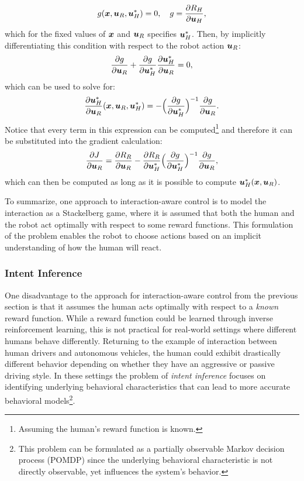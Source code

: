\begin{equation*}
g(\bm{x}, \bm{u}_R, \bm{u}_H^*) = 0, \quad g = \frac{\partial R_H}{\partial \bm{u}_H},
\end{equation*}
which for the fixed values of $\bm{x}$ and $\bm{u}_R$ specifies $\bm{u}_H^*$.
Then, by implicitly differentiating this condition with respect to the robot action $\bm{u}_R$:
\begin{equation*}
\frac{\partial g}{\partial \bm{u}_R} + \frac{\partial g}{\partial \bm{u}_H^*}\frac{\partial \bm{u}_H^*}{\partial \bm{u}_R} = 0,
\end{equation*}
which can be used to solve for:
\begin{equation*}
\frac{\partial \bm{u}_H^*}{\partial \bm{u}_R}(\bm{x}, \bm{u}_R, \bm{u}_H^*) = -\Big(\frac{\partial g}{\partial \bm{u}_H^*}\Big)^{-1}\frac{\partial g}{\partial \bm{u}_R}.
\end{equation*}
Notice that every term in this expression can be computed\footnote{Assuming the human's reward function is known.} and therefore it can be substituted into the gradient calculation:
\begin{equation*}
\frac{\partial J}{\partial \bm{u}_R} = \frac{\partial R_R}{\partial \bm{u}_R} - \frac{\partial R_R}{\partial \bm{u}_H^*}\Big(\frac{\partial g}{\partial \bm{u}_H^*}\Big)^{-1}\frac{\partial g}{\partial \bm{u}_R},
\end{equation*}
which can then be computed as long as it is possible to compute $\bm{u}_H^*(\bm{x}, \bm{u}_R)$.

To summarize, one approach to interaction-aware control is to model the interaction as a Stackelberg game, where it is assumed that both the human and the robot act optimally with respect to some reward functions. This formulation of the problem enables the robot to choose actions based on an implicit understanding of how the human will react.

\subsubsection{Intent Inference}
One disadvantage to the approach for interaction-aware control from the previous section is that it assumes the human acts optimally with respect to a \textit{known} reward function. While a reward function could be learned through inverse reinforcement learning, this is not practical for real-world settings where different humans behave differently. Returning to the example of interaction between human drivers and autonomous vehicles, the human could exhibit drastically different behavior depending on whether they have an aggressive or passive driving style. In these settings the problem of \textit{intent inference} focuses on identifying underlying behavioral characteristics that can lead to more accurate behavioral models\footnote{This problem can be formulated as a partially observable Markov decision process (POMDP) since the underlying behavioral characteristic is not directly observable, yet influences the system's behavior.}.

